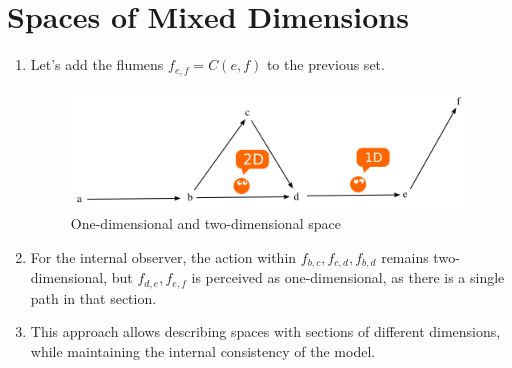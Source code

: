 \documentclass[final]{article}
\begin{document}
    \section{Spaces of Mixed Dimensions}
        \begin{enumerate}

            \item Let's add the flumens \( f_{e,f}=C(e,f) \) to the previous 
            set.

            \begin{figure}[H]
                \centering
                \includegraphics[width=\textwidth]{./2d-f1f2f3f4f5.png}
                \caption{One-dimensional and two-dimensional space}
                \label{fig:image}
            \end{figure}

            \item For the internal observer, the action within \( f_{b,c}, 
            f_{c,d}, f_{b,d} \) remains two-dimensional, but \( f_{d,e}, f_{e,f} 
            \) is perceived as one-dimensional, as there is a single path in 
            that section.

            \item This approach allows describing spaces with sections of 
            different dimensions, while maintaining the internal consistency of 
            the model.

        \end{enumerate}
\end{document}
